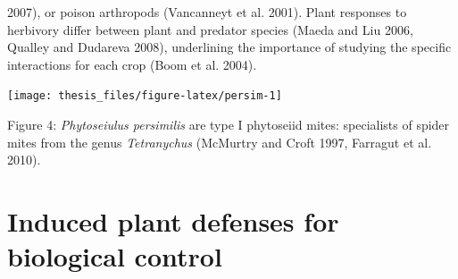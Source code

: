 \documentclass[12pt,final,CPage]{ufthesis}
\begin{document}
{2007), or poison arthropods (Vancanneyt et al. 2001). Plant responses to herbivory differ between plant and predator species (Maeda and Liu 2006, Qualley and Dudareva 2008), underlining the importance of studying the specific interactions for each crop (Boom et al. 2004).
  \begin{center}\texttt{[image: thesis\_files/figure-latex/persim-1]} \end{center}

  Figure 4: \emph{Phytoseiulus persimilis} are type I phytoseiid mites: specialists of spider mites from the genus \emph{Tetranychus} (McMurtry and Croft 1997, Farragut et al. 2010).

  \hypertarget{plantdef-litrev}{%
  \section{Induced plant defenses for biological control}\label{plantdef-litrev}}

}
\end{document}
